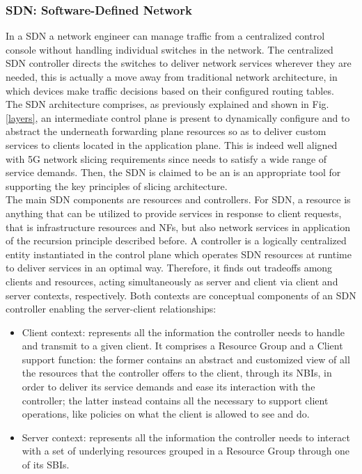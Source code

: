 \documentclass[a4paper,12pt]{report} %
\begin{document}
\subsubsection{SDN: Software-Defined Network}
In a SDN a network engineer can manage traffic from a centralized control console without handling individual switches in the network. The centralized SDN controller directs the switches to deliver network services wherever they are needed, this is actually a move away from traditional network architecture, in which devices make traffic decisions based on their configured routing tables.\\
The SDN architecture comprises, as previously explained and shown in Fig. \ref{layers}, an intermediate control plane is present to dynamically configure and to abstract the underneath forwarding plane resources so as to deliver custom services to clients located in the application plane. This is indeed
well aligned with 5G network
slicing requirements since needs to satisfy a wide range of service demands. Then, the SDN is claimed to be an is an appropriate tool for supporting the key principles of slicing architecture.\\
The main SDN components are resources and controllers. For
SDN, a resource is anything that can be utilized to
provide services in response to client requests, that is infrastructure resources and NFs, but also
network services in application of the recursion
principle described before. A controller is a logically centralized entity instantiated in the control
plane which operates SDN resources at runtime
to deliver services in an optimal way. Therefore,
it finds out tradeoffs among clients and resources, acting simultaneously as server and client via client
and server contexts, respectively. Both contexts
are conceptual components of an SDN controller
enabling the server-client relationships:
\begin{itemize}
\item Client context: represents all the information the
controller needs to handle and transmit to
a given client. It comprises a Resource Group and
a Client support function: the former contains an abstract and customized view of all the resources that the controller offers to the client, through its NBIs, in order to deliver its service demands and ease its interaction
with the controller; the latter instead contains all the
necessary to support client operations, like
policies on what the client is allowed to see and do.
\end{itemize}
\begin{itemize}
\item Server context: represents all the information the controller needs to interact with a set of
underlying resources grouped in a Resource
Group through one of its SBIs.
\end{itemize}
\end{document}
